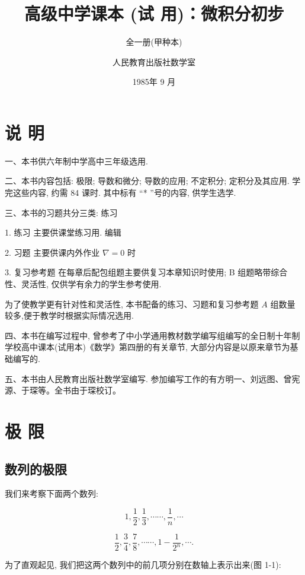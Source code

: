 \documentclass[lang=cn,newtx,10pt,scheme=chinese]{elegantbook}
\title{高级中学课本 (试 用)：微积分初步}
\subtitle{全一册(甲种本)}
\author{人民教育出版社数学室}
\institute{人民教育出版社}
\date{1985年 9 月}
\begin{document}
\maketitle

\chapter*{说 明}


一、本书供六年制中学高中三年级选用.

二、本书内容包括: 极限; 导数和微分; 导数的应用; 不定积分; 定积分及其应用. 学完这些内容, 约需 84 课时. 其中标有 “* ”号的内容, 供学生选学.

三、本书的习题共分三类: 练习

1. 练习 主要供课堂练习用. 编辑

2. 习题 主要供课内外作业 \(\nabla = 0\) 时

3. 复习参考题 在每章后配包组题主要供复习本章知识时使用; B 组题略带综合性、灵活性, 仅供学有余力的学生参考使用.

为了使教学更有针对性和灵活性, 本书配备的练习、习题和复习参考题 \(A\) 组数量较多,便于教学时根据实际情况选用.

四、本书在编写过程中, 曾参考了中小学通用教材数学编写组编写的全日制十年制学校高中课本(试用本)《数学》第四册的有关章节, 大部分内容是以原来章节为基础编写的.

五、本书由人民教育出版社数学室编写. 参加编写工作的有方明一、刘远图、曾宪源、于琛等。全书由于琛校订。

\frontmatter

\tableofcontents

\mainmatter

\chapter{极 限}


\section{数列的极限}

我们来考察下面两个数列:

\[
1,\frac{1}{2},\frac{1}{3},\cdots \cdots ,\frac{1}{n},\cdots \tag{1}
\]

\[
\frac{1}{2},\frac{3}{4},\frac{7}{8},\cdots \cdots ,1 - \frac{1}{{2}^{n}},\cdots \text{.} \tag{2}
\]

为了直观起见, 我们把这两个数列中的前几项分别在数轴上表示出来(图 1-1):
\end{document}
